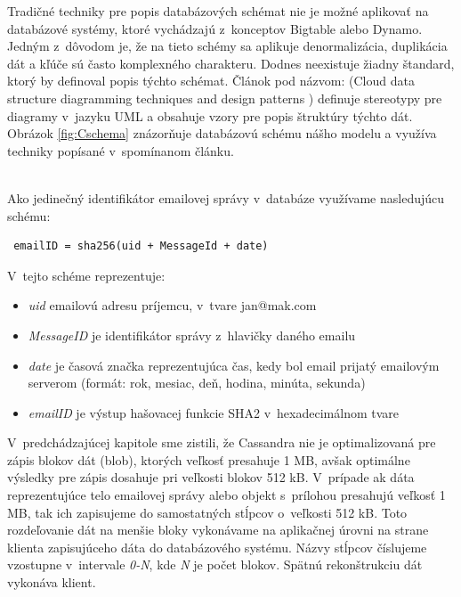 \documentclass[11pt,twoside,a4paper]{book}
\begin{document}
Tradičné techniky pre popis databázových schémat nie je možné aplikovať na databázové systémy, ktoré vychádzajú z~konceptov Bigtable alebo Dynamo. Jedným z~dôvodom je, že na tieto schémy sa aplikuje denormalizácia, duplikácia dát a kľúče sú často komplexného charakteru. Dodnes neexistuje žiadny štandard, ktorý by definoval popis týchto schémat. Článok pod názvom:  (Cloud data structure diagramming techniques and design patterns \cite{CloudDataStructureDiag}) definuje stereotypy pre diagramy v~jazyku UML a obsahuje vzory pre popis štruktúry týchto dát. Obrázok \ref{fig:Cschema} znázorňuje databázovú schému nášho modelu a využíva techniky popísané v~spomínanom článku.

\noindent
\\
Ako jedinečný identifikátor emailovej správy v~databáze využívame nasledujúcu schému:
\begin{verbatim}
 emailID = sha256(uid + MessageId + date)
\end{verbatim}

\noindent
V~tejto schéme reprezentuje:
\begin{itemize}
 \item \emph{uid} emailovú adresu príjemcu, v~tvare jan@mak.com
 \item \emph{MessageID} je identifikátor správy z~hlavičky daného emailu
 \item \emph{date} je časová značka reprezentujúca čas, kedy bol email prijatý emailovým serverom (formát: rok, mesiac, deň, hodina, minúta, sekunda)
 \item \emph{emailID} je výstup hašovacej funkcie SHA2 v~hexadecimálnom tvare
\end{itemize}



V~predchádzajúcej kapitole sme zistili, že Cassandra nie je optimalizovaná pre zápis blokov dát (blob), ktorých veľkosť presahuje 1 MB, avšak optimálne výsledky pre zápis dosahuje pri veľkosti blokov 512 kB. V~prípade ak dáta reprezentujúce telo emailovej správy alebo objekt s~prílohou presahujú veľkosť 1 MB, tak ich zapisujeme do samostatných stĺpcov o~veľkosti 512 kB. Toto rozdeľovanie dát na menšie bloky vykonávame na aplikačnej úrovni na strane klienta zapisujúceho dáta do databázového systému. Názvy stĺpcov číslujeme vzostupne v~intervale \emph{0-N}, kde \emph{N} je počet blokov. Spätnú rekonštrukciu dát vykonáva klient.
\end{document}
